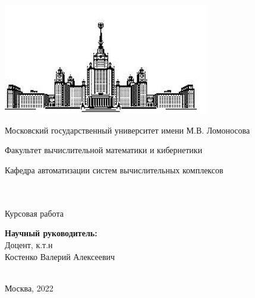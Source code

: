 \makeatletter
\begin{titlepage}
    \begin{center}
        \includegraphics[width=9cm]{imgs/msulogo.png}\\
        \small
        \centerline{Московский государственный университет имени М.В. Ломоносова}
        \centerline{Факультет вычислительной математики и кибернетики}
        \centerline{Кафедра автоматизации систем вычислительных комплексов}
        \centerline{}
        \Large
        \vfill
        {\@author}\\
        \null
        {\LARGE \bf
        \@title
        }\\
        \null \null
        {\large Курсовая работа}\\
        \null \null
    \end{center}
    \begin{flushright}
        {\bf Научный руководитель:}\\
        Доцент, к.т.н \\Костенко Валерий Алексеевич\\
        ~\\
        \vfill
    \end{flushright}
    \centerline{Москва, 2022}
\end{titlepage}
\setcounter{page}{2}
